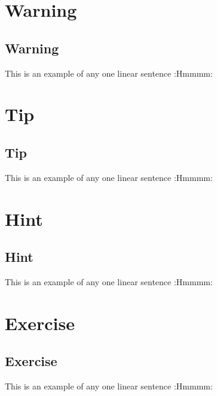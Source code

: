 \documentclass[11pt]{scrartcl} %
\begin{document}
\section{Warning}
\begin{warning}
\lipsum[1]
\end{warning}

\subsection{Warning}
\begin{warning}
This is an example of any one linear sentence :Hmmmm:
\end{warning}
\newpage

\section{Tip}
\begin{tip}
\lipsum[1]
\end{tip}

\subsection{Tip}
\begin{tip}
This is an example of any one linear sentence :Hmmmm:
\end{tip}
\newpage

\section{Hint}
\begin{hint}
\lipsum[1]
\end{hint}


\subsection{Hint}
\begin{hint}
This is an example of any one linear sentence :Hmmmm:
\end{hint}
\newpage


\section{Exercise}
\begin{exercise}
\lipsum[1]
\end{exercise}


\subsection{Exercise}
\begin{exercise}
This is an example of any one linear sentence :Hmmmm:
\end{exercise}
\newpage
\end{document}
